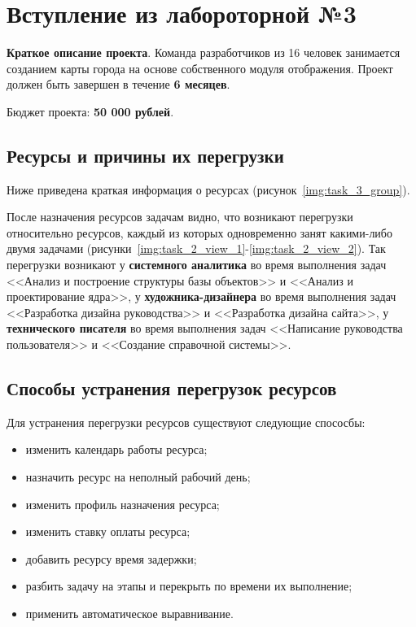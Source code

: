 \chapter{Вступление из лабороторной №3}

\textbf{Краткое описание проекта}. Команда разработчиков из 16 человек занимается созданием карты
города на основе собственного модуля отображения. Проект должен быть завершен в течение
\textbf{6 месяцев}. 

Бюджет проекта: \textbf{50 000 рублей}.

\section{Ресурсы и причины их перегрузки}

Ниже приведена краткая информация о ресурсах (рисунок~\ref{img:task_3_group}).

После назначения ресурсов задачам видно, что возникают перегрузки относительно ресурсов, каждый из которых
одновременно занят какими-либо двумя задачами (рисунки~\ref{img:task_2_view_1}-\ref{img:task_2_view_2}).
Так перегрузки возникают у \textbf{системного аналитика} во время выполнения задач <<Анализ и построение структуры базы объектов>> и <<Анализ и проектирование ядра>>, у \textbf{художника-дизайнера} во время выполнения задач <<Разработка дизайна руководства>> и <<Разработка дизайна сайта>>, у \textbf{технического писателя} во время выполнения задач <<Написание руководства пользователя>> и <<Создание справочной системы>>.

\section{Способы устранения перегрузок ресурсов}

Для устранения перегрузки ресурсов существуют следующие спососбы:
\begin{itemize}[label = ---]
	\item изменить календарь работы ресурса;
	\item назначить ресурс на неполный рабочий день;
	\item изменить профиль назначения ресурса;
	\item изменить ставку оплаты ресурса;
	\item добавить ресурсу время задержки;
	\item разбить задачу на этапы и перекрыть по времени их выполнение;
	\item применить автоматическое выравнивание.
\end{itemize}

